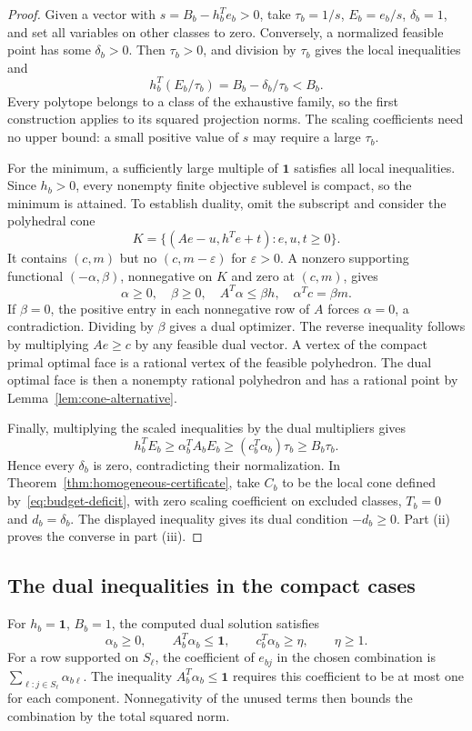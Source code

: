 \documentclass[11pt]{article}
\theoremstyle{definition}
\theoremstyle{remark}
\numberwithin{equation}{section}
\newcommand{\one}{\mathbf 1}
\begin{document}
\begin{proof}
Given a vector with $s=B_b-h_b^Te_b>0$, take
$\tau_b=1/s$, $E_b=e_b/s$, $\delta_b=1$, and set all variables
on other classes to zero. Conversely, a normalized feasible point
has some $\delta_b>0$. Then $\tau_b>0$, and division by
$\tau_b$ gives the local inequalities and
\[
           h_b^T(E_b/\tau_b)=B_b-\delta_b/\tau_b<B_b.
\]
Every polytope belongs to a class of the exhaustive family, so the
first construction applies to its squared projection norms. The scaling
coefficients need no upper bound: a small positive value of $s$
may require a large $\tau_b$.

For the minimum, a sufficiently large multiple of $\one$ satisfies
all local inequalities. Since $h_b>0$, every nonempty finite
objective sublevel is compact, so the minimum is attained. To
establish duality, omit the subscript and consider the polyhedral
cone
\[
       K=\{(Ae-u,h^Te+t):e,u,t\ge0\}.
\]
It contains $(c,m)$ but no $(c,m-\varepsilon)$ for
$\varepsilon>0$. A nonzero supporting functional $(-\alpha,\beta)$,
nonnegative on $K$ and zero at $(c,m)$, gives
\[
 \alpha\ge0,\quad\beta\ge0,\quad A^T\alpha\le\beta h,
                  \quad\alpha^Tc=\beta m.
\]
If $\beta=0$, the positive entry in each nonnegative row of $A$
forces $\alpha=0$, a contradiction. Dividing by $\beta$ gives a
dual optimizer. The reverse inequality follows by multiplying
$Ae\ge c$ by any feasible dual vector. A vertex of the compact
primal optimal face is a rational vertex of the feasible polyhedron.
The dual optimal face is then a nonempty rational polyhedron and
has a rational point by Lemma~\ref{lem:cone-alternative}.

Finally, multiplying the scaled inequalities by the dual
multipliers gives
\[
 h_b^TE_b\ge\alpha_b^TA_bE_b
            \ge(c_b^T\alpha_b)\tau_b\ge B_b\tau_b.
\]
Hence every $\delta_b$ is zero, contradicting their normalization.
In Theorem~\ref{thm:homogeneous-certificate}, take $C_b$ to be the
local cone defined by~\eqref{eq:budget-deficit}, with zero scaling
coefficient on excluded classes, $T_b=0$ and $d_b=\delta_b$.
The displayed inequality gives its dual condition $-d_b\ge0$.
Part (ii) proves the converse in part (iii).
\end{proof}

\subsection{The dual inequalities in the compact cases}

For $h_b=\one$, $B_b=1$, the computed dual solution satisfies
\begin{equation}\label{eq:capacity-dual}
 \alpha_b\ge0,\qquad A_b^T\alpha_b\le\one,\qquad
              c_b^T\alpha_b\ge\eta,\qquad\eta\ge1.
\end{equation}
For a row supported on $S_\ell$, the coefficient of $e_{bj}$ in
the chosen combination is
$\sum_{\ell:j\in S_\ell}\alpha_{b\ell}$. The inequality
$A_b^T\alpha_b\le\one$ requires this coefficient to be at most
one for each component. Nonnegativity of the unused terms then
bounds the combination by the total squared norm.
\end{document}
